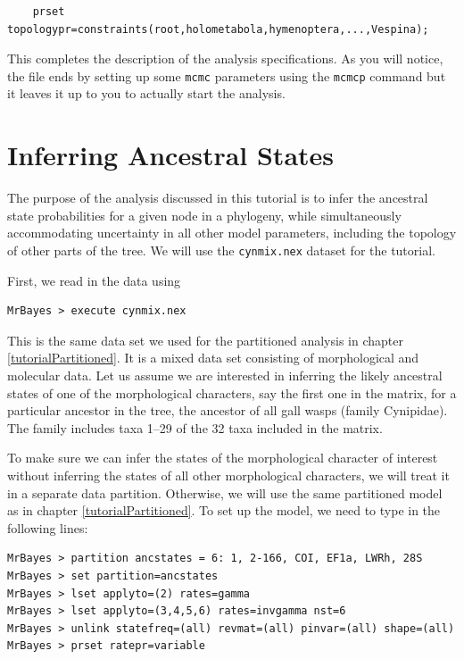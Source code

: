 \documentclass[12pt]{book}
\newcommand{\ttt}[1]{\texttt{#1} }
\begin{document}
\footnotesize
\begin{verbatim}
    prset topologypr=constraints(root,holometabola,hymenoptera,...,Vespina);
\end{verbatim}
\normalsize

This completes the description of the analysis specifications. As you will notice, the file ends by
setting up some \ttt{mcmc} parameters using the \ttt{mcmcp} command but it leaves it up to you to
actually start the analysis.

\section{Inferring Ancestral States}

The purpose of the analysis discussed in this tutorial is to infer the ancestral state
probabilities for a given node in a phylogeny, while simultaneously accommodating uncertainty in
all other model parameters, including the topology of other parts of the tree. We will use the
\ttt{cynmix.nex} dataset for the tutorial.

First, we read in the data using

\begin{verbatim}
MrBayes > execute cynmix.nex
\end{verbatim}

This is the same data set we used for the partitioned analysis in chapter
\ref{tutorialPartitioned}. It is a mixed data set consisting of morphological and molecular data.
Let us assume we are interested in inferring the likely ancestral states of one of the
morphological characters, say the first one in the matrix, for a particular ancestor in the tree,
the ancestor of all gall wasps (family Cynipidae). The family includes taxa 1--29 of the 32 taxa
included in the matrix.

To make sure we can infer the states of the morphological character of interest without inferring
the states of all other morphological characters, we will treat it in a separate data partition.
Otherwise, we will use the same partitioned model as in chapter \ref{tutorialPartitioned}. To set
up the model, we need to type in the following lines:

\footnotesize
\begin{singlespacing}
\begin{verbatim}
MrBayes > partition ancstates = 6: 1, 2-166, COI, EF1a, LWRh, 28S
MrBayes > set partition=ancstates
MrBayes > lset applyto=(2) rates=gamma
MrBayes > lset applyto=(3,4,5,6) rates=invgamma nst=6
MrBayes > unlink statefreq=(all) revmat=(all) pinvar=(all) shape=(all)
MrBayes > prset ratepr=variable
\end{verbatim}
\end{singlespacing}
\normalsize
\end{document}
